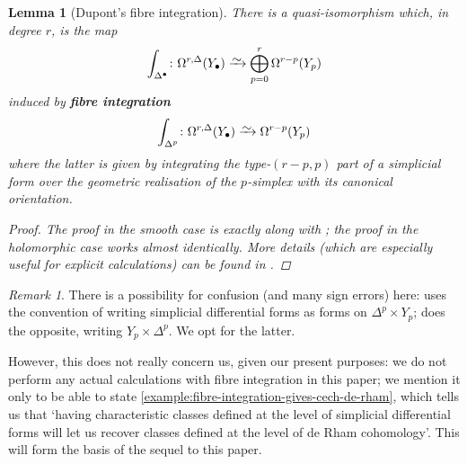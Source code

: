 \documentclass[11pt,fleqn]{article}
\theoremstyle{plain}
\newtheorem{lemma}[theorem]{Lemma}
\theoremstyle{definition}
\theoremstyle{remark}
\newtheorem{remark}[theorem]{Remark}
\numberwithin{equation}{theorem}
\newcommand{\congto}{\xrightarrow{\raisebox{-.5ex}[0ex][0ex]{$\sim$}}}
\newcommand{\define}[1]{\textbf{#1}}
\begin{document}
        \begin{lemma}[Dupont's fibre integration]\label{lemma:dupont's-fibre-integration}
            There is a quasi-isomorphism which, in degree $r$, is the map
            \begin{equation}
                \int_{\Delta^\bullet}\colon \Omega^{r,\Delta}({Y_\bullet})
                \congto
                \bigoplus_{p=0}^r\Omega^{r-p}({Y_p})
            \end{equation}
            induced by \define{fibre integration}
            \begin{equation}
                \int_{\Delta^p}\colon\Omega^{r,\Delta}({Y_\bullet})
                \congto
                \Omega^{r-p}({Y_p})
            \end{equation}
            where the latter is given by integrating the type-$(r-p,p)$ part of a simplicial form over the geometric realisation of the $p$-simplex with its canonical orientation.
            \begin{proof}
                The proof in the \emph{smooth} case is exactly \cite[Theorem~2.3]{Dupont1976} along with \cite[Remark~1, §2]{Dupont1976}; the proof in the holomorphic case works almost identically.
                More details (which are especially useful for explicit calculations) can be found in \cite{Hosgood2020}.
            \end{proof}
        \end{lemma}

        \begin{remark}
            There is a possibility for confusion (and many sign errors) here: \cite{Dupont1976} uses the convention of writing simplicial differential forms as forms on $\Delta^p\times Y_{p}$; \cite{Green1980} does the opposite, writing $Y_{p}\times\Delta^p$.
            We opt for the latter.

            However, this does not really concern us, given our present purposes: we do not perform any actual calculations with fibre integration in this paper; we mention it only to be able to state \cref{example:fibre-integration-gives-cech-de-rham}, which tells us that `having characteristic classes defined at the level of simplicial differential forms will let us recover classes defined at the level of de Rham cohomology'.
            This will form the basis of the sequel to this paper.
        \end{remark}
\end{document}
